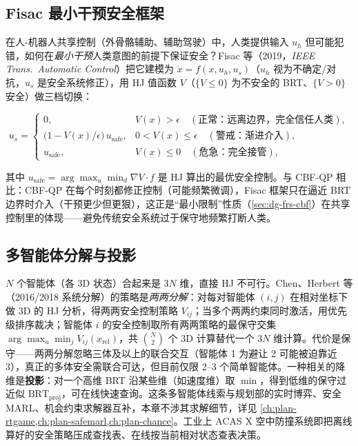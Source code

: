 \subsection{Fisac 最小干预安全框架}
\label{sec:hj-fisac}

在人-机器人共享控制（外骨骼辅助、辅助驾驶）中，人类提供输入 $u_h$ 但可能犯错，如何在\emph{最小干预}人类意图的前提下保证安全？Fisac 等（2019，\emph{IEEE Trans.\ Automatic Control}\cite{fisac2019general}）把它建模为 $\dot x=f(x,u_h,u_s)$（$u_h$ 视为不确定/对抗，$u_s$ 是安全系统修正），用 HJ 值函数 $V$（$\{V\le0\}$ 为不安全的 BRT、$\{V>0\}$ 安全）做三档切换：

\begin{equation}
  u_s=\begin{cases}
    0, & V(x)>\epsilon\quad(\text{正常：远离边界，完全信任人类}),\\[2pt]
    \big(1-V(x)/\epsilon\big)\,u_{\mathrm{safe}}, & 0<V(x)\le\epsilon\quad(\text{警戒：渐进介入}),\\[2pt]
    u_{\mathrm{safe}}, & V(x)\le0\quad(\text{危急：完全接管}),
  \end{cases}
  \label{eq:hj-fisac}
\end{equation}

其中 $u_{\mathrm{safe}}=\arg\max_u\min_d\nabla V\cdot f$ 是 HJ 算出的最优安全控制。与 CBF-QP 相比：CBF-QP 在每个时刻都修正控制（可能频繁微调），Fisac 框架只在逼近 BRT 边界时介入（干预更少但更狠），这正是“最小限制”性质（\cref{sec:dg-frs-cbf}）在共享控制里的体现——避免传统安全系统过于保守地频繁打断人类。

\subsection{多智能体分解与投影}
\label{sec:hj-multiagent}

$N$ 个智能体（各 3D 状态）合起来是 $3N$ 维，直接 HJ 不可行。Chen、Herbert 等（2016/2018 系统分解\cite{chen2018decomposition}）的策略是\emph{两两分解}：对每对智能体 $(i,j)$ 在相对坐标下做 3D 的 HJ 分析，得两两安全控制策略 $V_{ij}$；当多个两两约束同时激活，用优先级排序裁决；智能体 $i$ 的安全控制取所有两两策略的最保守交集 $\arg\max_u\min_j V_{ij}(x_{\mathrm{rel}})$，共 $\binom N2$ 个 3D 计算替代一个 $3N$ 维计算。代价是保守——两两分解忽略三体及以上的联合交互（智能体 1 为避让 2 可能被迫靠近 3），真正的多体安全需联合可达，但目前仅限 2--3 个简单智能体。一种相关的降维是\textbf{投影}：对一个高维 BRT 沿某些维（如速度维）取 $\min$，得到低维的保守过近似 $\mathrm{BRT}_{\mathrm{proj}}$，可在线快速查询。这条多智能体线索与规划部的实时博弈、安全 MARL、机会约束求解器互补，本章不涉其求解细节，详见 \cref{ch:plan-rtgame,ch:plan-safemarl,ch:plan-chance}。工业上 ACAS X 空中防撞系统即把离线算好的安全策略压成查找表、在线按当前相对状态查表决策。

